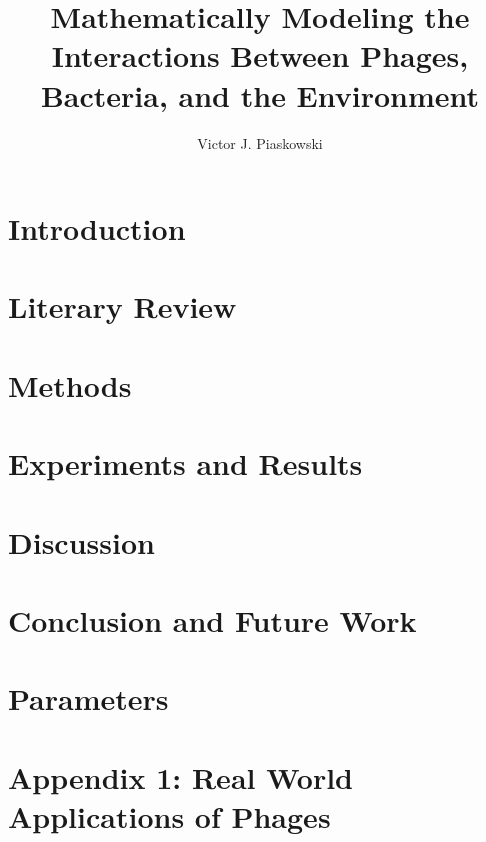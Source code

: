 \documentclass[titlepage]{article}
\begin{document}
\title{Mathematically Modeling the Interactions Between Phages,  Bacteria, and the Environment}
\author{Victor J. Piaskowski}
\maketitle
\begin{abstract}
    
\end{abstract}
\newpage


\newpage

\tableofcontents
\newpage 
{}
\section{Introduction}
\label{sec:Introduction}

\newpage

\section{Literary Review}
\label{sec:Literature}

\newpage

\section{Methods}
\label{sec:Methods}

\newpage

\section{Experiments and Results}
    \label{sec:Experiments}
    
    \newpage

\section{Discussion}
    \label{sec:Discussion}
    
    \newpage

\section{Conclusion and Future Work}
    \label{sec:Conclusion}
    
    \newpage
\printbibliography[heading=bibintoc, title={References}]
\newpage

\appendix 
\section{Parameters}
    \label{sec:Parameters}
    
    \newpage

\section{Appendix 1: Real World Applications of Phages}
    \label{sec:Appendix1}
    
    \newpage
\end{document}
